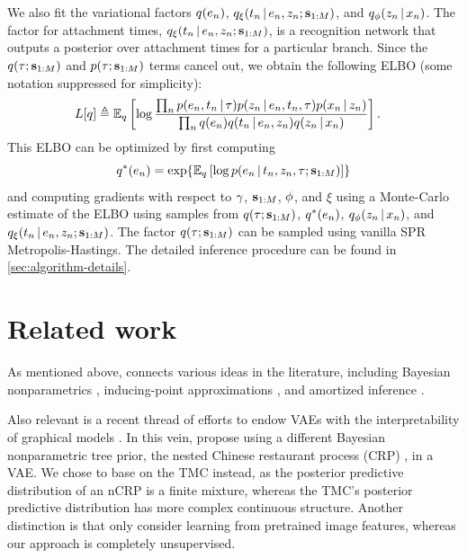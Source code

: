 We also fit the variational factors
$q(e_n)$,
$q_{\xi}(t_n \,|\, e_n, z_n; \mathbf{s}_{1:M})$,
and
$q_\phi(z_n \,|\, x_n)$.
The factor for attachment times,
$q_{\xi}(t_n \,|\, e_n, z_n; \mathbf{s}_{1:M})$, is a
recognition network that outputs
a posterior over attachment times for a particular branch.
Since the $q(\tau; \mathbf{s}_{1:M})$ and $p(\tau; \mathbf{s}_{1:M})$ terms
cancel out, we obtain the following ELBO (some notation suppressed for simplicity):
\begin{equation}
    \begin{split}
    L[q] &\triangleq \mathbb{E}_q \left[\log \frac{\prod_n p(e_n, t_n \,|\, \tau) p(z_n \,|\, e_n, t_n, \tau)p(x_n \,|\, z_n)}{\prod_n q(e_n)q(t_n \,|\, e_n, z_n)q(z_n \,|\, x_n)}\right].
    \end{split}
\end{equation}
This ELBO can be optimized by first computing
\begin{equation}
    \q^*(e_\n) = \exp{\E_\q\left[\log \p(e_\n \given t_\n, \z_\n, \tree; \inducingpoints)\right]}
\end{equation}
and computing gradients with respect to $\gamma$, $\mathbf{s}_{1:M}$,
$\phi$, and $\xi$ using a Monte-Carlo estimate of the ELBO
using samples from $q(\tau; \mathbf{s}_{1:M})$, $q^*(e_n)$, $q_\phi(z_n \,|\, x_n)$, and $q_{\xi}(t_n \,|\, e_n, z_n; \mathbf{s}_{1:M})$.
The factor $q(\tau; \mathbf{s}_{1:M})$ can
be sampled using vanilla SPR Metropolis-Hastings. 
The detailed inference procedure can be found in \autoref{sec:algorithm-details}.

\section{Related work}
As mentioned above, \acronym\;connects various ideas in the literature, including Bayesian nonparametrics \citep{Boyles2012}, inducing-point approximations \citep[e.g.; ][]{Snelson2006,Tomczak2017},
and amortized inference \citep{Kingma2013, Rezende2014}.

Also relevant is a recent thread of efforts to endow VAEs with the interpretability of graphical models \citep[e.g.; ][]{Johnson2016,Lin2018}.
In this vein, \citet{Goyal2017} propose using a different Bayesian nonparametric tree prior, the nested Chinese restaurant process (CRP) \citep{Blei2010}, in a VAE.
We chose to base \acronym\;on the TMC instead, as the posterior predictive distribution of an nCRP is a finite mixture, whereas the TMC's posterior predictive distribution has more complex continuous structure.
Another distinction is that \citet{Goyal2017} only consider learning from pretrained image features, whereas our approach is completely unsupervised.

